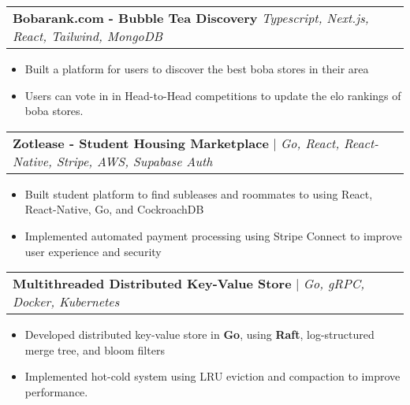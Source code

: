 \documentclass[letterpaper,11pt]{article}
\makeatletter
\newcommand{\resumeItem}[1]{
  \item\small{
    {#1 \vspace{-2pt}}
  }
}
\newcommand{\resumeProjectHeading}[2]{
    \item
    \begin{tabular*}{0.97\textwidth}{l@{\extracolsep{\fill}}r}
      \small#1 & #2 \\
    \end{tabular*}\vspace{-7pt}
}
\newcommand{\resumeItemListStart}{\begin{itemize}}
\newcommand{\resumeItemListEnd}{\end{itemize}\vspace{-5pt}}
\makeatother
\begin{document}
        \resumeProjectHeading
          {\textbf{Bobarank.com - Bubble Tea Discovery} \emph{Typescript, Next.js, React, Tailwind, MongoDB}}{}
          \resumeItemListStart
          \resumeItem{Built a platform for users to discover the best boba stores in their area}
          \resumeItem{Users can vote in in Head-to-Head competitions to update the elo rankings of boba stores.}
          \resumeItemListEnd

        \resumeProjectHeading
          {\textbf{Zotlease - Student Housing Marketplace} $|$ \emph{Go, React, React-Native, Stripe, AWS, Supabase Auth}}{}
          \resumeItemListStart
            \resumeItem{Built student platform to find subleases and roommates to using React, React-Native, Go, and CockroachDB}
            \resumeItem{Implemented automated payment processing using Stripe Connect to improve user experience and security}
          \resumeItemListEnd

        \resumeProjectHeading
          {\textbf{Multithreaded Distributed Key-Value Store} $|$ \emph{Go, gRPC, Docker, Kubernetes}}{}
          \resumeItemListStart
            \resumeItem{Developed distributed key-value store in \textbf{Go}, using \textbf{Raft}, log-structured merge tree, and bloom filters}
            \resumeItem{Implemented hot-cold system using LRU eviction and compaction to improve performance.}
          \resumeItemListEnd


\end{document}
